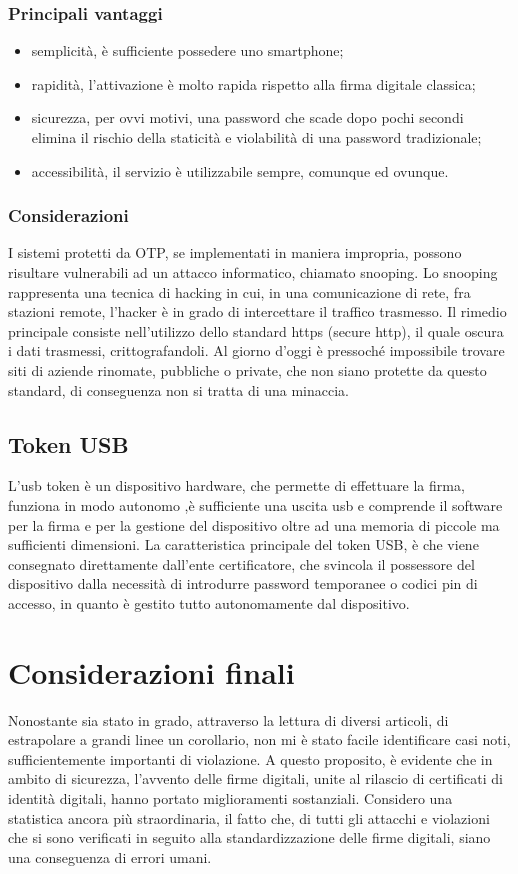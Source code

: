 \subsubsection{Principali vantaggi}
\begin{itemize}
	\item semplicità, è sufficiente possedere uno smartphone;
	\item rapidità, l'attivazione è molto rapida rispetto alla firma digitale classica;
	\item sicurezza, per ovvi motivi, una password che scade dopo pochi secondi elimina il rischio della staticità e violabilità di una password tradizionale;
	\item accessibilità, il servizio è utilizzabile sempre, comunque ed ovunque.
\end{itemize}

\subsubsection{Considerazioni}
I sistemi protetti da OTP, se implementati in maniera impropria, possono risultare vulnerabili ad un attacco informatico, chiamato snooping. Lo snooping rappresenta una tecnica di hacking in cui, in una comunicazione di rete, fra stazioni remote, l'hacker è in grado di intercettare il traffico trasmesso. Il rimedio principale consiste nell'utilizzo dello standard https (secure http), il quale oscura i dati trasmessi, crittografandoli. Al giorno d'oggi è pressoché impossibile trovare siti di aziende rinomate, pubbliche o private, che non siano protette da questo standard, di conseguenza non si tratta di una minaccia. 

\subsection{Token USB}

L'usb token è un dispositivo hardware, che permette di effettuare la firma, funziona in modo autonomo ,è sufficiente una uscita usb e comprende il software per la firma e per la gestione del dispositivo oltre ad una memoria di piccole ma sufficienti dimensioni. La caratteristica principale del token USB, è che viene consegnato direttamente dall'ente certificatore, che svincola il possessore del dispositivo dalla necessità di introdurre password temporanee o codici pin di accesso, in quanto è gestito tutto autonomamente dal dispositivo.

\section{Considerazioni finali}

Nonostante sia stato in grado, attraverso la lettura di diversi articoli, di estrapolare a grandi linee un corollario, non mi è stato facile identificare casi noti, sufficientemente importanti di violazione. A questo proposito, è evidente che in ambito di sicurezza, l'avvento delle firme digitali, unite al rilascio di certificati di identità digitali, hanno portato miglioramenti sostanziali. Considero una statistica ancora più straordinaria, il fatto che, di tutti gli attacchi e violazioni che si sono verificati in seguito alla standardizzazione delle firme digitali, siano una conseguenza di errori umani. 